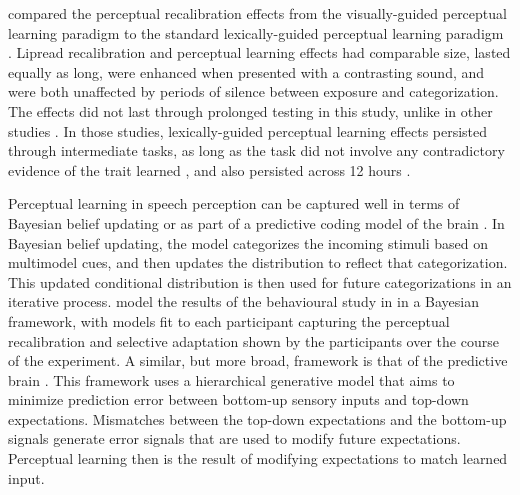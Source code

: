 \citet{vanLinden2007} compared the perceptual recalibration effects from the visually-guided perceptual learning paradigm \citep{Bertelson2003} to the standard lexically-guided perceptual learning paradigm \citep{Norris2003}.  
Lipread recalibration and perceptual learning effects had comparable size, lasted equally as long, were enhanced when presented with a contrasting sound, and were both unaffected by periods of silence between exposure and categorization.  
The effects did not last through prolonged testing in this study, unlike in other studies \citep{Kraljic2005,Eisner2006}.
In those studies, lexically-guided perceptual learning effects persisted through intermediate tasks, as long as the task did not involve any contradictory evidence of the trait learned \citep{Kraljic2005}, and also persisted across 12 hours \citep{Eisner2006}.

Perceptual learning in speech perception can be captured well in terms of Bayesian belief updating \citep{Kleinschmidt2011} or as part of a predictive coding model of the brain \citep{Clark2013}.  
In Bayesian belief updating, the model categorizes the incoming stimuli based on multimodel cues, and then updates the distribution to reflect that categorization.  
This updated conditional distribution is then used for future categorizations in an iterative process.  
\citet{Kleinschmidt2011} model the results of the behavioural study in \citet{Vroomen2007} in a Bayesian framework, with models fit to each participant capturing the perceptual recalibration and selective adaptation shown by the participants over the course of the experiment.  
A similar, but more broad, framework is that of the predictive brain \citep{Clark2013}. 
This framework uses a hierarchical generative model that aims to minimize prediction error between bottom-up sensory inputs and top-down expectations.  
Mismatches between the top-down expectations and the bottom-up signals generate error signals that are used to modify future expectations.  
Perceptual learning then is the result of modifying expectations to match learned input.

